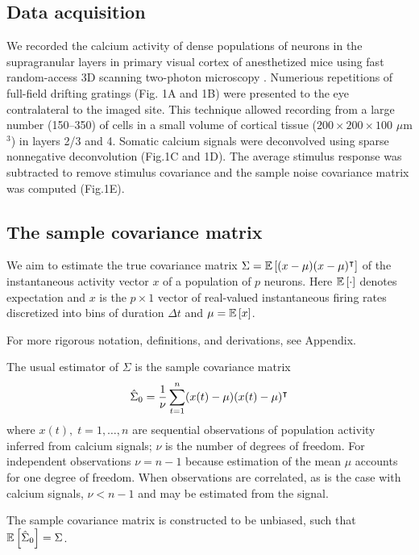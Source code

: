 \subsection*{Data acquisition}
We recorded the calcium activity  of dense populations of neurons in the supragranular layers in primary visual cortex of anesthetized mice using fast random-access 3D scanning two-photon microscopy \cite{Stosiek:2003,Reddy:2005}.  Numerious repetitions of full-field drifting gratings (Fig. 1A and 1B) were presented to the eye contralateral to the imaged site. This technique allowed recording from a large number (150--350) of cells in a small volume of cortical tissue ($200\times200\times100$ $\mu$m$^3$) in layers 2/3 and 4. Somatic calcium signals were deconvolved using  sparse nonnegative deconvolution \cite{Vogelstein:2010} (Fig.\;1C and 1D).  The average stimulus response was subtracted to remove stimulus covariance and the sample noise covariance matrix was computed (Fig.\;1E).



\subsection*{The sample covariance matrix}
We aim to estimate the true covariance matrix $\Sigma = \mathbb E\left[ (x-\mu)(x-\mu)^\intercal\right]$ of the instantaneous activity vector $x$ of a population of $p$ neurons. Here $\mathbb E\left[ \cdot\right]$ denotes expectation  and $x$ is the $p\times 1$ vector of real-valued instantaneous firing rates discretized into bins of duration $\Delta t$ and $\mu = \mathbb E\left[ x\right]$.  

For more rigorous notation, definitions, and derivations, see Appendix. 

The usual estimator of $\Sigma$ is the sample covariance matrix
\begin{equation}
\hat \Sigma_0 = \frac 1 \nu \sum\limits_{t=1}^n (x(t)-\mu)(x(t)-\mu)^\intercal 
\end{equation}
where $x(t),\;t=1,\ldots,n$ are sequential observations of population activity inferred from calcium signals; $\nu$ is the number of degrees of freedom. For independent observations $\nu=n-1$ because estimation of the mean $\mu$ accounts for one degree of freedom. When observations are correlated, as is the case with calcium signals, $\nu < n-1$ and may be estimated from the signal. 

The sample covariance matrix is constructed to be unbiased, such that $\mathbb E\left[ \hat\Sigma_0\right] = \Sigma$. 

